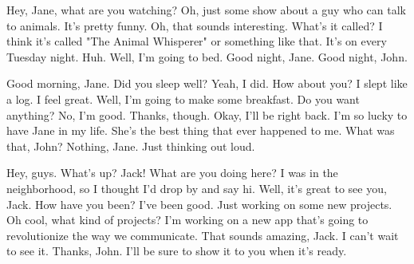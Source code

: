 
  Hey, Jane, what are you watching?
  Oh, just some show about a guy who can talk to animals. It's pretty funny.
  Oh, that sounds interesting. What's it called?
  I think it's called "The Animal Whisperer" or something like that. It's on every Tuesday night.
 Huh.
  Well, I'm going to bed. Good night, Jane.
  Good night, John.

  Good morning, Jane. Did you sleep well?
  Yeah, I did. How about you?
  I slept like a log. I feel great.
  Well, I'm going to make some breakfast. Do you want anything?
  No, I'm good. Thanks, though.
  Okay, I'll be right back.
  I'm so lucky to have Jane in my life. She's the best thing that ever happened to me.
  What was that, John?
  Nothing, Jane. Just thinking out loud.

  Hey, guys. What's up?
  Jack! What are you doing here?
  I was in the neighborhood, so I thought I'd drop by and say hi.
  Well, it's great to see you, Jack. How have you been?
  I've been good. Just working on some new projects.
 Oh cool, what kind of projects?
  I'm working on a new app that's going to revolutionize the way we communicate.
  That sounds amazing, Jack. I can't wait to see it.
  Thanks, John. I'll be sure to show it to you when it's ready.
